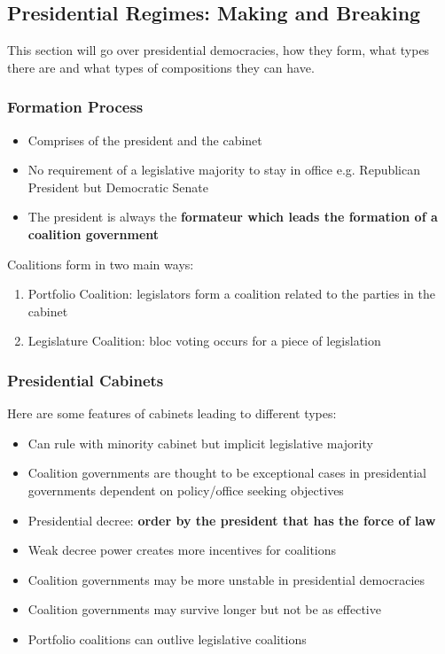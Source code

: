 \documentclass[12pt, letterpaper]{article}
\begin{document}
\subsection{Presidential Regimes: Making and Breaking}
This section will go over presidential democracies, how they form, what types there are and what types of compositions they can have.
\subsubsection{Formation Process}
\begin{itemize}
	\item Comprises of the president and the cabinet
	\item No requirement of a legislative majority to stay in office e.g. Republican President but Democratic Senate
	\item The president is always the \textbf{formateur which leads the formation of a coalition government}
\end{itemize}
Coalitions form in two main ways:
\begin{enumerate}
	\item Portfolio Coalition: legislators form a coalition related to the parties in the cabinet
	\item Legislature Coalition: bloc voting occurs for a piece of legislation
\end{enumerate}
\subsubsection{Presidential Cabinets}
Here are some features of cabinets leading to different types:
\begin{itemize}
	\item Can rule with minority cabinet but implicit legislative majority
	\item Coalition governments are thought to be exceptional cases in presidential governments dependent on policy/office seeking objectives
	\item Presidential decree: \textbf{order by the president that has the force of law}
	\item Weak decree power creates more incentives for coalitions
	\item Coalition governments may be more unstable in presidential democracies
	\item Coalition governments may survive longer but not be as effective
	\item Portfolio coalitions can outlive legislative coalitions
\end{itemize}
\end{document}
